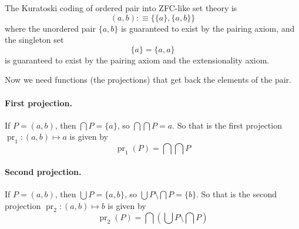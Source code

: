 \documentclass[11pt]{article}
\DeclareMathOperator{\pr}{pr}
\begin{document}
The Kuratoski coding of ordered pair into ZFC-like set theory is
$$
   (a, b) :\equiv \{ \{a\}, \{a, b\} \}
$$
where the unordered pair $\{a, b\}$ is guaranteed to exist by the
pairing axiom, and the singleton set
$$
   \{a\} = \{a, a\}
$$
is guaranteed to exist by the pairing axiom and the extensionality axiom.

Now we need functions (the projections) that get back the elements of
the pair.

\paragraph{First projection.}  If $P = (a, b)$, then $\bigcap P = \{a\}$,
so $\bigcap \bigcap P = a$.  So that is the first projection
$\pr_1 : (a, b) \mapsto a$ is given by
$$
   \pr_1(P) = \bigcap \bigcap P
$$

\paragraph{Second projection.}  If $P = (a, b)$,
then $\bigcup P = \{a, b\}$,
so $\bigcup P \setminus \bigcap P = \{b\}$.  So that is the second projection
$\pr_2 : (a, b) \mapsto b$ is given by
$$
   \pr_2(P) = \bigcap \left( \bigcup P \setminus \bigcap P \right)
$$
\end{document}
